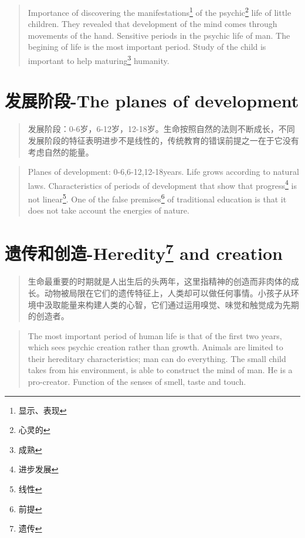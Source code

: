 \documentclass[lang=cn,10pt]{elegantbook}
\begin{document}
\begin{tcolorbox}
\begin{quote}
{\small Importance of discovering the manifestations\footnote{显示、表现} of the psychic\footnote{心灵的} life of little children. They revealed that development of the mind comes through movements of the hand. Sensitive periods in the psychic life of man. The begining of life is the most important period. Study of the child is important to help maturing\footnote{成熟} humanity.}
\end{quote}
\end{tcolorbox}

\chapter{发展阶段-The planes of development}

\begin{quote}
{\small 发展阶段：0-6岁，6-12岁，12-18岁。生命按照自然的法则不断成长，不同发展阶段的特征表明进步不是线性的，传统教育的错误前提之一在于它没有考虑自然的能量。}
\end{quote}

\begin{tcolorbox}
\begin{quote}
{\small Planes of development: 0-6,6-12,12-18years. Life grows according to natural laws. Characteristics of periods of development that show that progress\footnote{进步发展} is not linear\footnote{线性}. One of the false premises\footnote{前提} of traditional education is that it does not take account the energies of nature.}
\end{quote}
\end{tcolorbox}

\chapter{遗传和创造-Heredity\footnote{遗传} and creation}

\begin{quote}
{\small 生命最重要的时期就是人出生后的头两年，这里指精神的创造而非肉体的成长。动物被局限在它们的遗传特征上，人类却可以做任何事情。小孩子从环境中汲取能量来构建人类的心智，它们通过运用嗅觉、味觉和触觉成为先期的创造者。}
\end{quote}

\begin{tcolorbox}
\begin{quote}
{\small The most important period of human life is that of the first two years, which sees psychic creation rather than growth. Animals are limited to their hereditary characteristics; man can do everything. The small child takes from his environment, is able to construct the mind of man. He is a pro-creator. Function of the senses of smell, taste and touch.}
\end{quote}
\end{tcolorbox}
\end{document}

